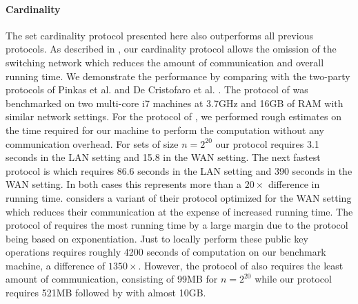 \paragraph{Cardinality} The set cardinality protocol presented here also outperforms all previous protocols. As described in , our cardinality protocol allows the omission of the switching network which reduces the amount of communication and overall running time. We demonstrate the performance by comparing with the two-party protocols of Pinkas et al. \cite{PSWW18} and De Cristofaro et al. \cite{DBLP:conf/cans/CristofaroGT12}. The protocol of  \cite{PSWW18} was benchmarked on two multi-core i7 machines at 3.7GHz and 16GB of RAM with similar network settings. For the protocol of \cite{DBLP:conf/cans/CristofaroGT12}, we performed rough estimates on the time required for our machine to perform the computation without any communication overhead. For sets of size $n=2^{20}$ our protocol requires 3.1 seconds in the LAN setting and 15.8 in the WAN setting. The next fastest protocol is \cite{PSWW18} which requires 86.6 seconds in the LAN setting and 390 seconds in the WAN setting. In both cases this represents more than a $20\times$ difference in running time.  \cite{PSWW18} considers a variant of their protocol optimized for the WAN setting which reduces their communication at the expense of increased running time. The protocol of \cite{DBLP:conf/cans/CristofaroGT12} requires the most running time by a large margin due to the protocol being based on exponentiation. Just to locally perform these public key operations requires roughly 4200 seconds of computation on our benchmark machine, a difference of $1350\times$. However, the protocol of \cite{DBLP:conf/cans/CristofaroGT12} also requires the least amount of communication, consisting of 99MB for $n=2^{20}$ while our protocol requires 521MB followed by \cite{PSWW18}  with almost 10GB.

\iffullversion

